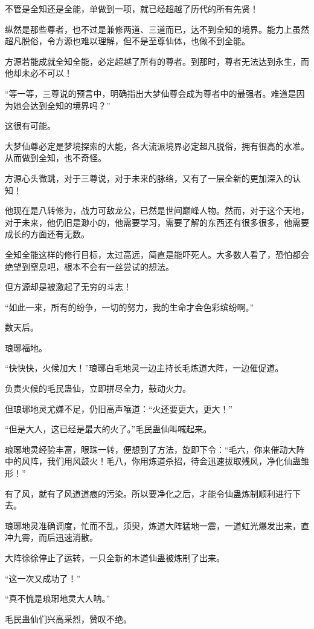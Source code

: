 \begin{this_body}
不管是全知还是全能，单做到一项，就已经超越了历代的所有先贤！

纵然是那些尊者，也不过是兼修两道、三道而已，达不到全知的境界。能力上虽然超凡脱俗，令方源也难以理解，但不是至尊仙体，也做不到全能。

方源若能成就全知全能，必定超越了所有的尊者。到那时，尊者无法达到永生，而他却未必不可以！

“等一等，三尊说的预言中，明确指出大梦仙尊会成为尊者中的最强者。难道是因为她会达到全知的境界吗？”

这很有可能。

大梦仙尊必定是梦境探索的大能，各大流派境界必定超凡脱俗，拥有很高的水准。从而做到全知，也不奇怪。

方源心头微跳，对于三尊说，对于未来的脉络，又有了一层全新的更加深入的认知！

他现在是八转修为，战力可敌龙公，已然是世间巅峰人物。然而，对于这个天地，对于未来，他仍旧是渺小的，他需要学习，需要了解的东西还有很多很多，他需要成长的方面还有无数。

全知全能这样的修行目标，太过高远，简直是能吓死人。大多数人看了，恐怕都会绝望到窒息吧，根本不会有一丝尝试的想法。

但方源却是被激起了无穷的斗志！

“如此一来，所有的纷争，一切的努力，我的生命才会色彩缤纷啊。”

数天后。

琅琊福地。

“快快快，火候加大！”琅琊白毛地灵一边主持长毛炼道大阵，一边催促道。

负责火候的毛民蛊仙，立即拼尽全力，鼓动火力。

但琅琊地灵尤嫌不足，仍旧高声嚷道：“火还要更大，更大！”

“但是大人，这已经是最大的火了。”毛民蛊仙叫喊起来。

琅琊地灵经验丰富，眼珠一转，便想到了方法，旋即下令：“毛六，你来催动大阵中的风阵，我们用风鼓火！毛八，你用炼道杀招，待会迅速拔取残风，净化仙蛊雏形！”

有了风，就有了风道道痕的污染。所以要净化之后，才能令仙蛊炼制顺利进行下去。

琅琊地灵准确调度，忙而不乱，须臾，炼道大阵猛地一震，一道虹光爆发出来，直冲九霄，而后迅速消散。

大阵徐徐停止了运转，一只全新的木道仙蛊被炼制了出来。

“这一次又成功了！”

“真不愧是琅琊地灵大人呐。”

毛民蛊仙们兴高采烈，赞叹不绝。


\end{this_body}
